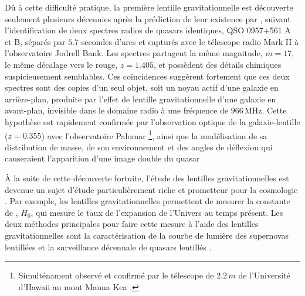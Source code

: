 Dû à cette difficulté pratique, 
la première lentille gravitationnelle est découverte seulement plusieurs décennies après la prédiction de leur existence par \citet{Walsh1979}, 
suivant l'identification de deux spectres radios de quasars identiques, QSO 0957+561 A et B, séparés par $5.7$ secondes d'arcs
et capturés avec le télescope radio Mark II à l'observatoire Jodrell Bank. 
Les spectres partagent la même magnitude, $m=17$, le même décalage vers le rouge, $z=1.405$, et possèdent des détails 
chimiques suspicieusement semblables. Ces coïncidences suggèrent fortement que ces deux spectres sont des copies d'un seul objet, soit un noyau 
actif d'une galaxie en arrière-plan, produite par l'effet de lentille gravitationnelle d'une galaxie en avant-plan, invisible dans le 
domaine radio à une fréquence de $966\,\mathrm{MHz}$. Cette hypothèse est rapidement confirmée par 
l'observation optique de la galaxie-lentille ($z=0.355$) avec l'observatoire Palomar \citep{Young1980}\footnote{Simulténament 
observé et confirmé par le télescope de $2.2\, m$ de l'Université d'Hawaii au mont Mauna Kea \citep{Stockton1980}.}, 
ainsi que la modélisation de sa distribution de masse, de son environnement 
et des angles de déflexion qui causeraient l'apparition d'une image double du quasar \citep{Young1981,Falco1991}

À la suite de cette découverte fortuite, l'étude des lentilles gravitationnelles est devenue un sujet d'étude 
particulièrement riche et prometteur pour la cosmologie \citep{Blandford1992,Bartelmann2010,Treu2010}. 
Par exemple, les lentilles gravitationnelles permettent de mesurer 
la constante de \citet{Hubble1929}, $H_0$, qui mesure le taux de l'expansion de l'Univers au temps présent. Les deux méthodes principales 
pour faire cette mesure à l'aide des lentilles gravitationnelles sont la caractérisation de la courbe de lumière des supernovas lentillées 
\citep{Refsdal1964,Kelly2015,Goobar2017} 
et la surveillance décennale de quasars lentillés 
\citep[e.g.][]{Vanderriest1989,Wong2020}. 



